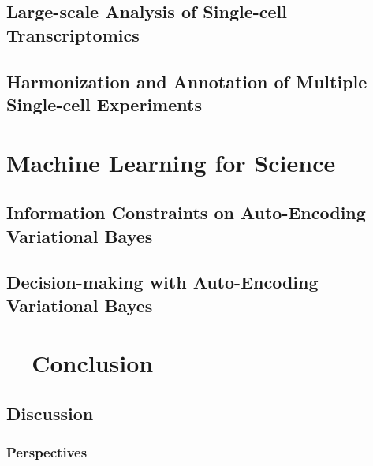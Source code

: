 \documentclass{ucbthesis}
\begin{document}
\chapter{Large-scale Analysis of Single-cell Transcriptomics}
\label{scvi}





\chapter{Harmonization and Annotation of Multiple Single-cell Experiments}
\label{scanvi}





\part{Machine Learning for Science}
\label{part2}
\chapter{Information Constraints on Auto-Encoding Variational Bayes}
\label{hcv}
% 








\chapter{Decision-making with Auto-Encoding Variational Bayes}
\label{decision}
% 










\part{~~Conclusion}
\chapter{Discussion}
\label{perspectives}

\section{Perspectives}


\printbibliography
\end{document}
